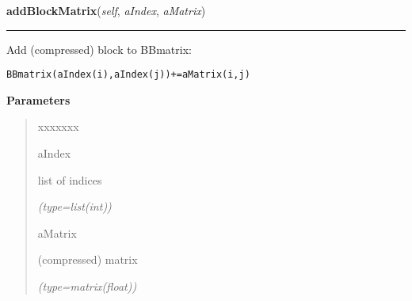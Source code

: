 \hspace{.8\funcindent}\begin{boxedminipage}{\funcwidth}

    \raggedright \textbf{addBlockMatrix}(\textit{self}, \textit{aIndex}, \textit{aMatrix})

    \vspace{-1.5ex}

    \rule{\textwidth}{0.5\fboxrule}
\setlength{\parskip}{2ex}
    Add (compressed) block to BBmatrix:

\begin{alltt}
 BBmatrix(aIndex(i),aIndex(j)) += aMatrix(i,j)\end{alltt}

\setlength{\parskip}{1ex}
      \textbf{Parameters}
      \vspace{-1ex}

      \begin{quote}
        \begin{Ventry}{xxxxxxx}

          \item[aIndex]

          list of indices

            {\it (type=list(int))}

          \item[aMatrix]

          (compressed) matrix

            {\it (type=matrix(float))}

        \end{Ventry}

      \end{quote}

    \end{boxedminipage}

    \label{gblnum:BorderedBandMatrix:getBlockMatrix}

    \vspace{0.5ex}

